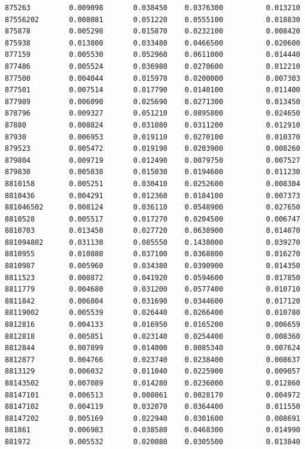 \documentclass[
  letterpaper,
  DIV=11,
  numbers=noendperiod]{scrartcl}
\begin{document}
\begin{verbatim}
875263         0.009098       0.038450    0.0376300          0.013210
87556202       0.008081       0.051220    0.0555100          0.018830
875878         0.005298       0.015870    0.0232100          0.008420
875938         0.013800       0.033480    0.0466500          0.020600
877159         0.005530       0.052960    0.0611000          0.014440
877486         0.005524       0.036980    0.0270600          0.012210
877500         0.004044       0.015970    0.0200000          0.007303
877501         0.007514       0.017790    0.0140100          0.011400
877989         0.006090       0.025690    0.0271300          0.013450
878796         0.009327       0.051210    0.0895800          0.024650
87880          0.008824       0.031080    0.0311200          0.012910
87930          0.006953       0.019110    0.0270100          0.010370
879523         0.005472       0.019190    0.0203900          0.008260
879804         0.009719       0.012490    0.0079750          0.007527
879830         0.005038       0.015030    0.0194600          0.011230
8810158        0.005251       0.030410    0.0252600          0.008304
8810436        0.004291       0.012360    0.0184100          0.007373
881046502      0.008124       0.036110    0.0548900          0.027650
8810528        0.005517       0.017270    0.0204500          0.006747
8810703        0.013450       0.027720    0.0638900          0.014070
881094802      0.031130       0.085550    0.1438000          0.039270
8810955        0.010880       0.037100    0.0368800          0.016270
8810987        0.005960       0.034380    0.0390900          0.014350
8811523        0.008872       0.041920    0.0594600          0.017850
8811779        0.004680       0.031200    0.0577400          0.010710
8811842        0.006804       0.031690    0.0344600          0.017120
88119002       0.005539       0.026440    0.0266400          0.010780
8812816        0.004133       0.016950    0.0165200          0.006659
8812818        0.005851       0.023140    0.0254400          0.008360
8812844        0.007899       0.014000    0.0085340          0.007624
8812877        0.004766       0.023740    0.0238400          0.008637
8813129        0.006032       0.011040    0.0225900          0.009057
88143502       0.007089       0.014280    0.0236000          0.012860
88147101       0.006513       0.008061    0.0028170          0.004972
88147102       0.004119       0.032070    0.0364400          0.011550
88147202       0.005169       0.022940    0.0301600          0.008691
881861         0.006983       0.038580    0.0468300          0.014990
881972         0.005532       0.020080    0.0305500          0.013840

\end{verbatim}
\end{document}
